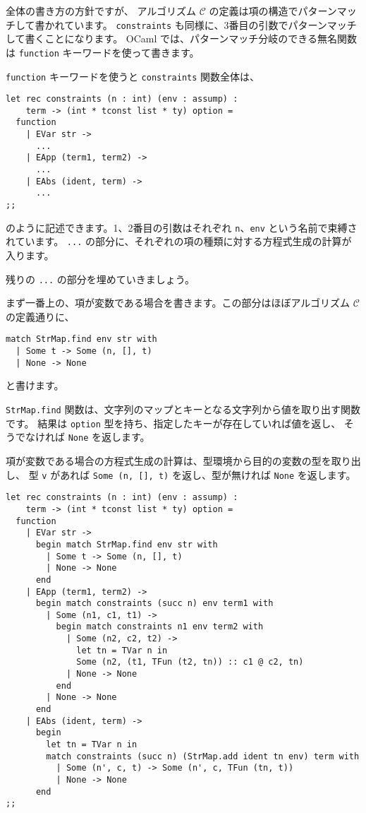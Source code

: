全体の書き方の方針ですが、
アルゴリズム $\mathcal C$ の定義は項の構造でパターンマッチして書かれています。
\texttt{constraints} も同様に、3番目の引数でパターンマッチして書くことになります。
OCaml では、パターンマッチ分岐のできる無名関数は \texttt{function} キーワードを使って書きます。

\texttt{function} キーワードを使うと \texttt{constraints} 関数全体は、
\begin{lstlisting}
let rec constraints (n : int) (env : assump) :
    term -> (int * tconst list * ty) option =
  function
    | EVar str ->
      ...
    | EApp (term1, term2) ->
      ...
    | EAbs (ident, term) ->
      ...
;;
\end{lstlisting}
のように記述できます。1、2番目の引数はそれぞれ \texttt{n}、\texttt{env} という名前で束縛されています。
\texttt{...} の部分に、それぞれの項の種類に対する方程式生成の計算が入ります。

残りの \texttt{...} の部分を埋めていきましょう。

まず一番上の、項が変数である場合を書きます。この部分はほぼアルゴリズム $\mathcal C$ の定義通りに、
\begin{lstlisting}
match StrMap.find env str with
  | Some t -> Some (n, [], t)
  | None -> None
\end{lstlisting}
と書けます。

\texttt{StrMap.find} 関数は、文字列のマップとキーとなる文字列から値を取り出す関数です。
結果は \texttt{option} 型を持ち、指定したキーが存在していれば値を返し、
そうでなければ \texttt{None} を返します。

項が変数である場合の方程式生成の計算は、型環境から目的の変数の型を取り出し、
型 \texttt{v} があれば \texttt{Some (n, [], t)} を返し、型が無ければ \texttt{None} を返します。



\begin{lstlisting}[caption=方程式を生成する関数, label=list:ocaml-stlc-infer]
let rec constraints (n : int) (env : assump) :
    term -> (int * tconst list * ty) option =
  function
    | EVar str ->
      begin match StrMap.find env str with
        | Some t -> Some (n, [], t)
        | None -> None
      end
    | EApp (term1, term2) ->
      begin match constraints (succ n) env term1 with
        | Some (n1, c1, t1) ->
          begin match constraints n1 env term2 with
            | Some (n2, c2, t2) ->
              let tn = TVar n in
              Some (n2, (t1, TFun (t2, tn)) :: c1 @ c2, tn)
            | None -> None
          end
        | None -> None
      end
    | EAbs (ident, term) ->
      begin
        let tn = TVar n in
        match constraints (succ n) (StrMap.add ident tn env) term with
          | Some (n', c, t) -> Some (n', c, TFun (tn, t))
          | None -> None
      end
;;
\end{lstlisting}

